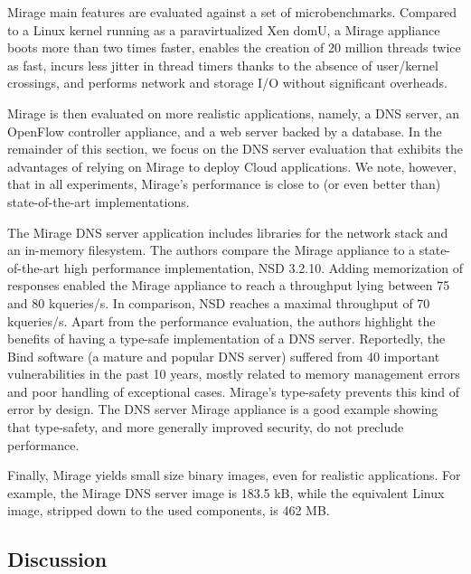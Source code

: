 Mirage main features are evaluated against a set of microbenchmarks.
Compared to a Linux kernel running as a paravirtualized Xen domU, a Mirage appliance boots more than two times faster, enables the creation of 20 million threads twice as fast, incurs less jitter in thread timers thanks to the absence of user/kernel crossings, and performs network and storage I/O without significant overheads.

Mirage is then evaluated on more realistic applications, namely, a DNS server, an OpenFlow controller appliance, and a web server backed by a database.
In the remainder of this section, we focus on the DNS server evaluation that exhibits the advantages of relying on Mirage to deploy Cloud applications.
We note, however, that in all experiments, Mirage's performance is close to (or even better than) state-of-the-art implementations.

The Mirage DNS server application includes libraries for the network stack and an in-memory filesystem.
The authors compare the Mirage appliance to a state-of-the-art high performance implementation, NSD 3.2.10.
Adding memorization of responses enabled the Mirage appliance to reach a throughput lying between 75 and 80 kqueries/s.
In comparison, NSD reaches a maximal throughput of 70 kqueries/s.
Apart from the performance evaluation, the authors highlight the benefits of having a type-safe implementation of a DNS server.
Reportedly, the Bind software (a mature and popular DNS server) suffered from 40 important vulnerabilities in the past 10 years, mostly related to memory management errors and poor handling of exceptional cases.
Mirage's type-safety prevents this kind of error by design.
The DNS server Mirage appliance is a good example showing that type-safety, and more generally improved security, do not preclude performance. 

Finally, Mirage yields small size binary images, even for realistic applications.
For example, the Mirage DNS server image is 183.5 kB, while the equivalent Linux image, stripped down to the used components, is 462 MB.


\subsection{Discussion}

